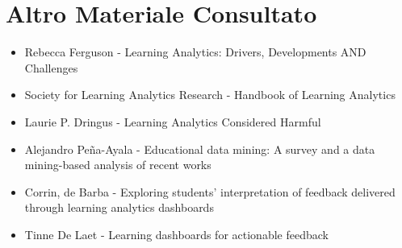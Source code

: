 \chapter{Altro Materiale Consultato}

\begin{itemize}

\item Rebecca Ferguson - Learning Analytics: Drivers, Developments AND Challenges
\item Society for Learning Analytics Research - Handbook of Learning Analytics
\item Laurie P. Dringus - Learning Analytics Considered Harmful
\item Alejandro Peña-Ayala - Educational data mining: A survey and a data mining-based analysis
of recent works
\item Corrin, de Barba - Exploring students' interpretation of feedback delivered through learning analytics dashboards
\item Tinne De Laet - Learning dashboards for actionable feedback

\end{itemize}

